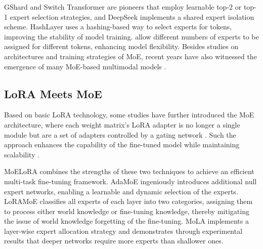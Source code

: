 GShard \cite{lepikhin2020gshard} and Switch Transformer \cite{fedus2022switch} are pioneers that employ learnable top-2 or top-1 expert selection strategies, and DeepSeek \cite{dai2024deepseekmoe} implements a shared expert isolation scheme. HashLayer \cite{roller2021hash} uses a hashing-based way to select experts for tokens, improving the stability of model training. \cite{huang2024harder,zhou2022mixture,yang2024xmoe} allow different numbers of experts to be assigned for different tokens, enhancing model flexibility. Besides studies on architectures and training strategies of MoE, recent years have also witnessed the emergence of many MoE-based multimodal models \cite{riquelme2021scaling,mustafa2022multimodal,du2022glam}.

\subsection{LoRA Meets MoE}
Based on basic LoRA technology, some studies have further introduced the MoE architecture, where each weight matrix's LoRA adapter is no longer a single module but are a set of adapters controlled by a gating network \cite{yang2024moral,wu2024parameter}. Such the approach enhances the capability of the fine-tuned model while maintaining scalability \cite{li2024mixlora,wumixture}. 

MoELoRA \cite{liu2024moe} combines the strengths of these two techniques to achieve an efficient multi-task fine-tuning framework. 
AdaMoE \cite{zeng2024adamoe} ingeniously introduces additional null expert networks, enabling a learnable and dynamic selection of the experts. 
LoRAMoE \cite{dou2024loramoe} classifies all experts of each layer into two categories, assigning them to process either world knowledge or fine-tuning knowledge, thereby mitigating the issue of world knowledge forgetting of the fine-tuning. 
MoLA \cite{gao2024higher} implements a layer-wise expert allocation strategy and demonstrates through experimental results that deeper networks require more experts than shallower ones.